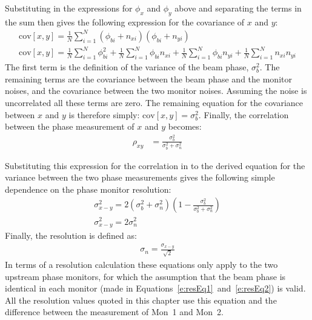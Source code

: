 Substituting in the expressions for \(\phi_{x}\) and \(\phi_{y}\) above and separating the terms in the sum then gives the following expression for the covariance of \(x\) and \(y\):
\begin{equation}
\begin{gathered}
\mathrm{cov}[x,y] = \frac{1}{N}\sum_{i=1}^{N}(\phi_{bi}+n_{xi})(\phi_{bi}+n_{yi}) \\
\mathrm{cov}[x,y] = \frac{1}{N}\sum_{i=1}^{N}\phi_{bi}^2 + \frac{1}{N}\sum_{i=1}^{N}\phi_{bi}n_{xi} + \frac{1}{N}\sum_{i=1}^{N}\phi_{bi}n_{yi} + \frac{1}{N}\sum_{i=1}^{N}n_{xi}n_{yi} 
\end{gathered}
\end{equation}
The first term is the definition of the variance of the beam phase, \(\sigma_b^2\). The remaining terms are the covariance between the beam phase and the monitor noises, and the covariance between the two monitor noises. Assuming the noise is uncorrelated all these terms are zero. The remaining equation for the covariance between \(x\) and \(y\) is therefore simply: \(\mathrm{cov}[x,y] = \sigma_b^2\). Finally, the correlation between the phase measurement of \(x\) and \(y\) becomes:
\begin{align}
\rho_{xy} &= \frac{\sigma_b^2}{\sigma_b^2 + \sigma_n^2}
\label{e:corrVsResolution}
\end{align}

Substituting this expression for the correlation in to the derived equation for the variance between the two phase measurements gives the following simple dependence on the phase monitor resolution:
\begin{equation}
\begin{gathered}
\sigma_{x-y}^2 = 2(\sigma_b^2 + \sigma_n^2)\left(1-\frac{\sigma_b^2}{\sigma_b^2 + \sigma_n^2}\right) \\
\sigma_{x-y}^2 = 2\sigma_n^2 \label{e:pffVsResolution}
\end{gathered}
\end{equation}
Finally, the resolution is defined as:
\begin{align}
\sigma_n = \frac{\sigma_{x-y}}{\sqrt{2}}
\label{e:resolutionEq}
\end{align}
In terms of a resolution calculation these equations only apply to the two upstream phase monitors, for which the assumption that the beam phase is identical in each monitor (made in Equations~\ref{e:resEq1}~and~\ref{e:resEq2}) is valid. All the resolution values quoted in this chapter use this equation and the difference between the measurement of Mon~1 and Mon~2.

